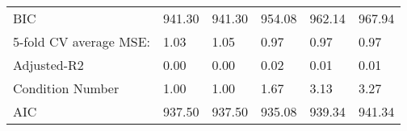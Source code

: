 \begin{table}
\begin{center}
\begin{tabular}{llllll}
BIC                                   & 941.30 & 941.30 & 954.08 & 962.14  & 967.94    \\
5-fold CV average MSE:                & 1.03   & 1.05   & 0.97   & 0.97    & 0.97      \\
Adjusted-R2                           & 0.00   & 0.00   & 0.02   & 0.01    & 0.01      \\
Condition Number                      & 1.00   & 1.00   & 1.67   & 3.13    & 3.27      \\
AIC                                   & 937.50 & 937.50 & 935.08 & 939.34  & 941.34    \\
\hline
\end{tabular}
\end{center}
\end{table}
